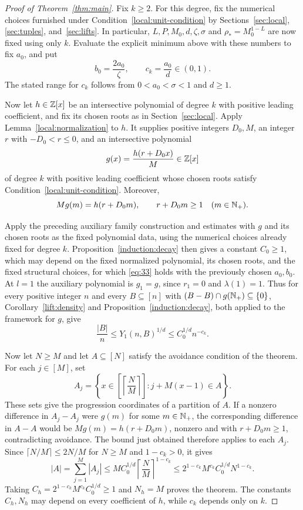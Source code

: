 \begin{proof}[Proof of Theorem~\ref{thm:main}]
Fix $k\ge2$.  For this degree, fix the numerical choices furnished under
Condition~\eqref{local:unit-condition} by Sections~\ref{sec:local},
\ref{sec:tuples}, and~\ref{sec:lifts}.  In particular,
$L,P,M_0,d,\zeta,\sigma$ and $\rho_*=M_0^{1-L}$ are now fixed using only
$k$.  Evaluate the explicit minimum above with these numbers to fix $a_0$,
and put
\[
 b_0=\frac{2a_0}{\zeta},\qquad c_k=\frac{a_0}{d}\in(0,1).
\]
The stated range for $c_k$ follows from $0<a_0<\sigma<1$ and $d\ge1$.

Now let $h\in\mathbb Z[x]$ be an intersective polynomial of degree $k$ with
positive leading coefficient, and fix its chosen roots as in
Section~\ref{sec:local}.  Apply Lemma~\ref{local:normalization} to $h$.
It supplies positive integers
$D_0,M$, an integer $r$ with $-D_0<r\le0$, and an intersective polynomial
\[
 g(x)=\frac{h(r+D_0x)}{M}\in\mathbb Z[x]
\]
of degree $k$ with positive leading coefficient whose chosen roots satisfy
Condition~\eqref{local:unit-condition}.  Moreover,
\[
 Mg(m)=h(r+D_0m),\qquad r+D_0m\ge1\quad(m\in\mathbb N_+).
\]

Apply the preceding auxiliary family construction and estimates with $g$ and
its chosen roots as the fixed polynomial data, using the numerical choices
already fixed for degree $k$.  Proposition~\ref{induction:decay} then gives
a constant $C_0\ge1$, which may depend on the fixed normalized polynomial,
its chosen roots, and the fixed structural choices, for which
\eqref{eq:33} holds with the previously chosen $a_0,b_0$.
At $l=1$ the auxiliary polynomial is $g_1=g$, since $r_1=0$ and
$\lambda(1)=1$.  Thus for every positive integer $n$ and every
$B\subseteq[n]$ with $(B-B)\cap g(\mathbb N_+)\subseteq\{0\}$,
Corollary~\ref{lift:density} and Proposition~\ref{induction:decay},
both applied to the framework for $g$, give
\[
 \frac{|B|}{n}
 \le Y_1(n,B)^{1/d}
 \le C_0^{1/d}n^{-c_k}.
\]

Now let $N\ge M$ and let $A\subseteq[N]$ satisfy the avoidance condition
of the theorem.  For each $j\in[M]$, set
\[
 A_j=\left\{x\in\left[\left\lceil\frac NM\right\rceil\right]:
            j+M(x-1)\in A\right\}.
\]
These sets give the progression coordinates of a partition of $A$.
If a nonzero difference in $A_j-A_j$ were $g(m)$ for some $m\in\mathbb N_+$,
the corresponding difference in $A-A$ would be
$Mg(m)=h(r+D_0m)$, nonzero and with $r+D_0m\ge1$, contradicting avoidance.
The bound just obtained therefore applies to each $A_j$.  Since
$\lceil N/M\rceil\le2N/M$ for $N\ge M$ and $1-c_k>0$, it gives
\[
 |A|=\sum_{j=1}^M|A_j|
 \le M C_0^{1/d}\left\lceil\frac NM\right\rceil^{1-c_k}
 \le 2^{1-c_k}M^{c_k}C_0^{1/d}N^{1-c_k}.
\]
Taking $C_h=2^{1-c_k}M^{c_k}C_0^{1/d}\ge1$ and $N_h=M$ proves the theorem.
The constants $C_h,N_h$ may depend on every coefficient of $h$, while
$c_k$ depends only on $k$.
\end{proof}
